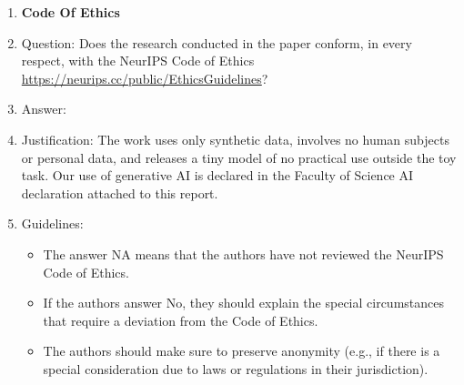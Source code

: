 \begin{enumerate}
\item {\bf Code Of Ethics}
    \item[] Question: Does the research conducted in the paper conform, in every respect, with the NeurIPS Code of Ethics \url{https://neurips.cc/public/EthicsGuidelines}?
    \item[] Answer: \answerYes{}
    \item[] Justification: The work uses only synthetic data, involves no human subjects or personal data, and releases a tiny model of no practical use outside the toy task. Our use of generative AI is declared in the Faculty of Science AI declaration attached to this report.
    \item[] Guidelines:
    \begin{itemize}
        \item The answer NA means that the authors have not reviewed the NeurIPS Code of Ethics.
        \item If the authors answer No, they should explain the special circumstances that require a deviation from the Code of Ethics.
        \item The authors should make sure to preserve anonymity (e.g., if there is a special consideration due to laws or regulations in their jurisdiction).
    \end{itemize}



\end{enumerate}

